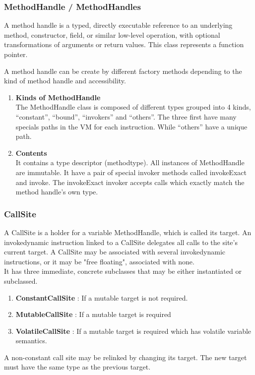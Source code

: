 \documentclass{sigplanconf}
\def \DALVIK{\mbox{Dalvik}\xspace}
\def \VM{VM\xspace}
\begin{document}

        

      \subsubsection{MethodHandle / MethodHandles}
        \label{MH}
        A method handle is a typed, directly executable reference to
        an underlying method, constructor, field, or similar low-level operation,
        with optional transformations of arguments or return values.
        This class represents a function pointer.
        
        A method handle can be create by different factory methods depending to the kind of method handle and accessibility.
        

        \begin{enumerate}
          \item \textbf{Kinds of MethodHandle}\\
            The MethodHandle class is composed of different types grouped into 4 kinds,
            ``constant'', ``bound'', ``invokers'' and ``others''.
            The three first have many specials paths in the \VM for each instruction.
            While ``others'' have a unique path.
          \item \textbf{Contents}\\
            It contains a type descriptor (methodtype).
            All instances of MethodHandle are immutable.
            It have a pair of special invoker methods called invokeExact and invoke.
            The invokeExact invoker accepts calls which exactly match the method handle's own type.
        \end{enumerate}

      \subsubsection{CallSite}
        A CallSite is a holder for a variable MethodHandle, which is called its target.
        An invokedynamic instruction linked to a CallSite delegates all calls to the site's current target.
        A CallSite may be associated with several invokedynamic instructions,
        or it may be "free floating", associated with none.\\

        It has three immediate, concrete subclasses that may be either instantiated or subclassed.
        \begin{enumerate}
          \item \textbf{ConstantCallSite} : If a mutable target is not required.
          \item \textbf{MutableCallSite}  : If a mutable target is required
          \item \textbf{VolatileCallSite} : If a mutable target is required which has volatile variable semantics.
        \end{enumerate}
        A non-constant call site may be relinked by changing its target.
        The new target must have the same type as the previous target.
\end{document}
